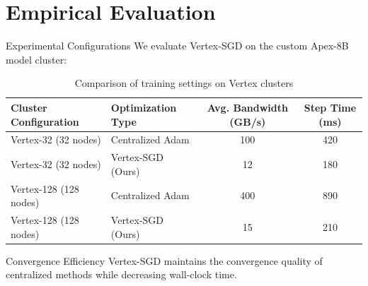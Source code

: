 \section{Empirical Evaluation}

\begin{frame}{Experimental Configurations}
    We evaluate Vertex-SGD on the custom Apex-8B model cluster:
    \vskip 0.5cm
    \begin{table}
        \centering
        \caption{Comparison of training settings on Vertex clusters}
        \begin{tabular}{llcc}
            \toprule
            Cluster Configuration & Optimization Type & Avg. Bandwidth (GB/s) & Step Time (ms) \\
            \midrule
            Vertex-32 (32 nodes)  & Centralized Adam  & 100                   & 420            \\
            Vertex-32 (32 nodes)  & Vertex-SGD (Ours) & 12                    & 180            \\
            Vertex-128 (128 nodes) & Centralized Adam  & 400                   & 890            \\
            Vertex-128 (128 nodes) & Vertex-SGD (Ours) & 15                    & 210            \\
            \bottomrule
        \end{tabular}
    \end{table}
\end{frame}

\begin{frame}{Convergence Efficiency}
    Vertex-SGD maintains the convergence quality of centralized methods while decreasing wall-clock time.
    \vskip 0.2cm
    \begin{center}
    \end{center}
\end{frame}

